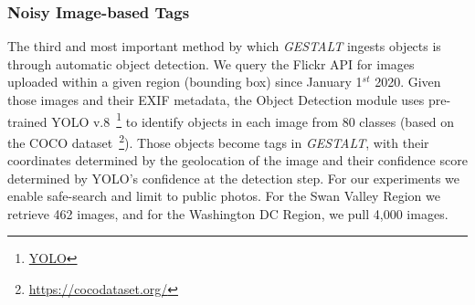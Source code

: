 \subsubsection{Noisy Image-based Tags}
The third and most important method by which \emph{GESTALT} ingests objects is through automatic object detection.
We query the Flickr API for images uploaded within a given region (bounding box) since January 1$^{st}$ 2020. 
Given those images and their EXIF metadata, the Object Detection module uses pre-trained YOLO v.8~\footnote{\href{https://github.com/ultralytics/ultralytics}{YOLO}} to identify objects in each image from 80 classes (based on the COCO dataset~\footnote{\href{{https://cocodataset.org/}}{https://cocodataset.org/}}). 
Those objects become tags in \emph{GESTALT}, with their coordinates determined by the geolocation of the image and their confidence score determined by YOLO's confidence at the detection step.
For our experiments we enable safe-search and limit to public photos. For the Swan Valley Region we retrieve 462 images, and for the Washington DC Region, we pull 4,000 images.%

